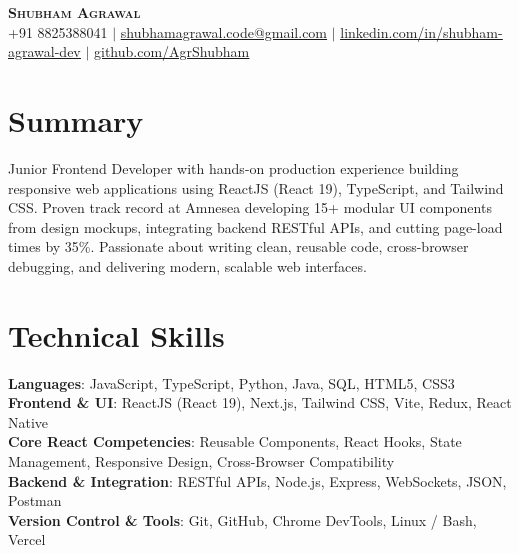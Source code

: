 \documentclass[letterpaper,10.5pt]{article}
\begin{document}
\begin{center}
    \textbf{\Huge \scshape Shubham Agrawal} \\ \vspace{2pt}
    \small +91 8825388041 $|$ \href{mailto:shubhamagrawal.code@gmail.com}{\underline{shubhamagrawal.code@gmail.com}} $|$ 
    \href{https://linkedin.com/in/shubham-agrawal-dev}{\underline{linkedin.com/in/shubham-agrawal-dev}} $|$
    \href{https://github.com/AgrShubham}{\underline{github.com/AgrShubham}}
\end{center}

\section{Summary}
\begin{itemize}[leftmargin=0.15in, label={}]
    \small{\item{
     Junior Frontend Developer with hands-on production experience building responsive web applications using ReactJS (React 19), TypeScript, and Tailwind CSS. Proven track record at Amnesea developing 15+ modular UI components from design mockups, integrating backend RESTful APIs, and cutting page-load times by 35\%. Passionate about writing clean, reusable code, cross-browser debugging, and delivering modern, scalable web interfaces.
    }}
\end{itemize}

\section{Technical Skills}
 \begin{itemize}[leftmargin=0.15in, label={}]
    \small{\item{
     \textbf{Languages}{: JavaScript, TypeScript, Python, Java, SQL, HTML5, CSS3} \\
     \textbf{Frontend \& UI}{: ReactJS (React 19), Next.js, Tailwind CSS, Vite, Redux, React Native} \\
     \textbf{Core React Competencies}{: Reusable Components, React Hooks, State Management, Responsive Design, Cross-Browser Compatibility} \\
     \textbf{Backend \& Integration}{: RESTful APIs, Node.js, Express, WebSockets, JSON, Postman} \\
     \textbf{Version Control \& Tools}{: Git, GitHub, Chrome DevTools, Linux / Bash, Vercel}
    }}
 \end{itemize}
\end{document}
